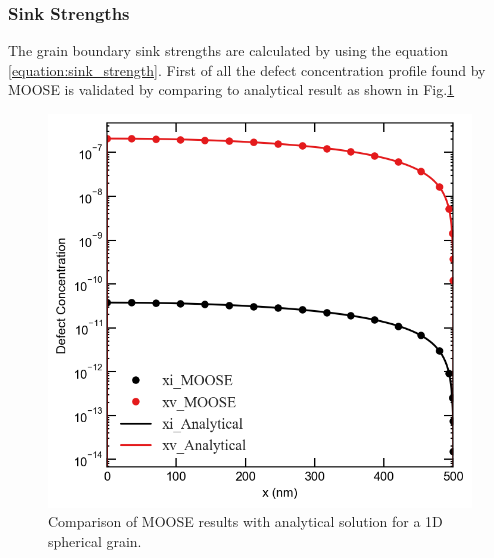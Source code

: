 \documentclass[a4paper]{article}
\begin{document}
    \subsubsection{Sink Strengths}
    The grain boundary sink strengths are calculated by using the equation \ref{equation:sink_strength}. First of all the defect concentration profile found by MOOSE is validated by comparing to analytical result as shown in Fig.\ref{figure:concentrations_MOOSE_analytical}
      \begin{figure}[h!]
        \centering
        \includegraphics[scale=0.6]{concentration_profiles_MOOSE_Analytical_Neutron_0}
        \caption{Comparison of MOOSE results with analytical solution for a 1D spherical grain.\cite{heald1977}}
        \label{figure:concentrations_MOOSE_analytical}
      \end{figure}
\end{document}
